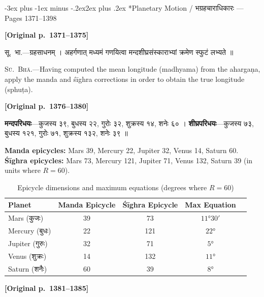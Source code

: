 \documentclass[11pt,a4paper]{article}
\makeatletter
\renewcommand{\section}{\@startsection {section}{1}{\z@}%
  {-3ex plus -1ex minus -.2ex}{2ex plus .2ex}%
  {\normalfont\Large\bfseries\color{sectioncolor}}}
\newcommand{\dev}[1]{{\devanagarifont\mdseries\upshape #1}}
\newcommand{\pagelabel}[1]{\textcolor{sectioncolor}{\textbf{[Original p.~#1]}}}
\newcommand{\bilingualpair}[2]{%
  \noindent%
  \begin{minipage}[t]{0.47\textwidth}
    \begin{flushleft}
      \small\dev{#1}
    \end{flushleft}
  \end{minipage}%
  \hfill\vrule\hfill%
  \begin{minipage}[t]{0.47\textwidth}
    \begin{flushleft}
      \small #2
    \end{flushleft}
  \end{minipage}%
  \par\vspace{1.2ex}
}
\makeatother
\begin{document}
\newpage

\section*{Planetary Motion / \dev{भग्रहचाराधिकारः} --- Pages 1371--1398}

\pagelabel{1371--1375}

\bilingualpair{%
सू.~भा.---ग्रहसाधनम् । अहर्गणात् मध्यमं गणयित्वा मन्दशीघ्रसंस्काराभ्यां क्रमेण स्फुटं लभ्यते ॥
}{%
\textsc{Sū.~Bhā.}---Having computed the mean longitude (madhyama) from the ahargaṇa, apply the manda and śīghra corrections in order to obtain the true longitude (sphuṭa).
}

\vspace{0.5ex}
\pagelabel{1376--1380}

\bilingualpair{%
\textbf{मन्दपरिधयः}---कुजस्य $३९$, बुधस्य $२२$, गुरोः $३२$, शुक्रस्य $१४$, शनेः $६०$ । \textbf{शीघ्रपरिधयः}---कुजस्य $७३$, बुधस्य $१२१$, गुरोः $७१$, शुक्रस्य $१३२$, शनेः $३९$ ॥
}{%
\textbf{Manda epicycles:} Mars 39, Mercury 22, Jupiter 32, Venus 14, Saturn 60. \textbf{Śīghra epicycles:} Mars 73, Mercury 121, Jupiter 71, Venus 132, Saturn 39 (in units where $R = 60$).
}

\vspace{1ex}

\begin{table}[h]
\centering
\small
\begin{tabular}{lcccc}
\toprule
\textbf{Planet} & \textbf{Manda Epicycle} & \textbf{Śīghra Epicycle} & \textbf{Max Equation} \\
\midrule
Mars (कुजः) & 39 & 73 & $11° 30'$ \\
Mercury (बुधः) & 22 & 121 & $22°$ \\
Jupiter (गुरुः) & 32 & 71 & $5°$ \\
Venus (शुक्रः) & 14 & 132 & $11°$ \\
Saturn (शनैः) & 60 & 39 & $8°$ \\
\bottomrule
\end{tabular}
\caption*{Epicycle dimensions and maximum equations (degrees where $R=60$)}
\end{table}

\vspace{0.5ex}
\pagelabel{1381--1385}
\end{document}
